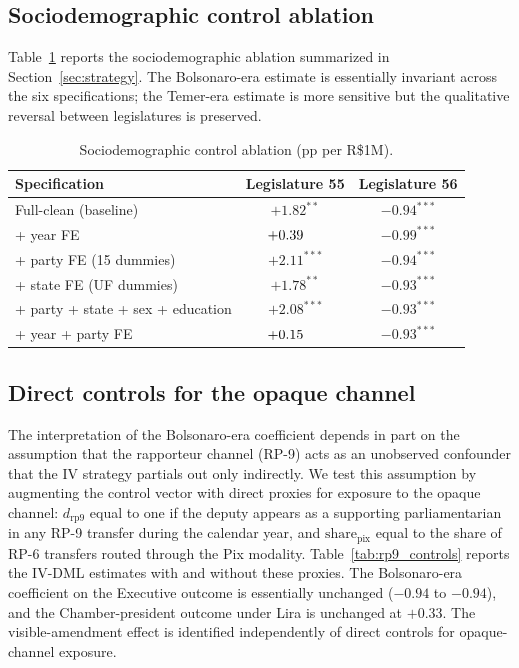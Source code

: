 \documentclass[preprint,12pt,authoryear]{elsarticle}
\begin{document}
\subsection{Sociodemographic control ablation}
\label{app:ablation}

Table~\ref{tab:ablation} reports the sociodemographic ablation summarized in Section~\ref{sec:strategy}. The Bolsonaro-era estimate is essentially invariant across the six specifications; the Temer-era estimate is more sensitive but the qualitative reversal between legislatures is preserved.

\begin{table}[htbp]
\centering
\caption{Sociodemographic control ablation (pp per R\$1M).}
\label{tab:ablation}
\begin{threeparttable}
\small
\begin{tabular}{lcc}
\toprule
Specification & Legislature 55 & Legislature 56 \\
\midrule
Full-clean (baseline)                       & $+1.82^{**}$  & $-0.94^{***}$ \\
\quad + year FE                             & $+0.39\hspace{1.4em}$ & $-0.99^{***}$ \\
\quad + party FE (15 dummies)               & $+2.11^{***}$ & $-0.94^{***}$ \\
\quad + state FE (UF dummies)               & $+1.78^{**}$  & $-0.93^{***}$ \\
\quad + party + state + sex + education     & $+2.08^{***}$ & $-0.93^{***}$ \\
\quad + year + party FE                     & $+0.15\hspace{1.4em}$ & $-0.93^{***}$ \\
\bottomrule
\end{tabular}
\end{threeparttable}
\end{table}

\subsection{Direct controls for the opaque channel}
\label{app:rp9_controls}

The interpretation of the Bolsonaro-era coefficient depends in part on the assumption that the rapporteur channel (RP-9) acts as an unobserved confounder that the IV strategy partials out only indirectly. We test this assumption by augmenting the control vector with direct proxies for exposure to the opaque channel: $d_{\mathrm{rp9}}$ equal to one if the deputy appears as a supporting parliamentarian in any RP-9 transfer during the calendar year, and $\mathrm{share}_{\mathrm{pix}}$ equal to the share of RP-6 transfers routed through the Pix modality. Table~\ref{tab:rp9_controls} reports the IV-DML estimates with and without these proxies. The Bolsonaro-era coefficient on the Executive outcome is essentially unchanged ($-0.94$ to $-0.94$), and the Chamber-president outcome under Lira is unchanged at $+0.33$. The visible-amendment effect is identified independently of direct controls for opaque-channel exposure.
\end{document}
